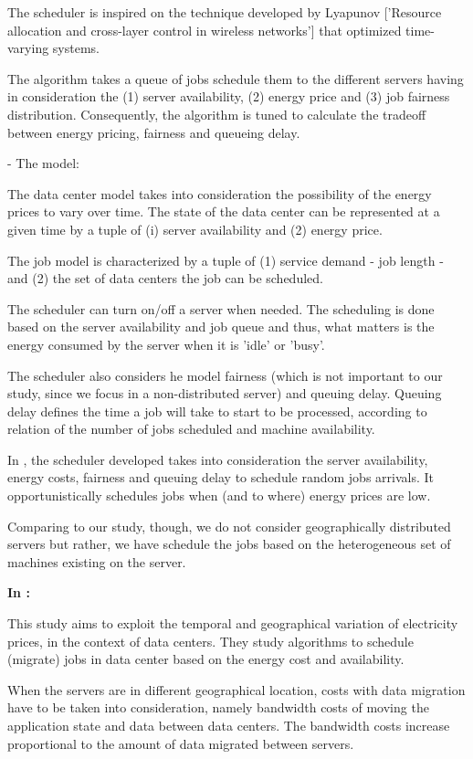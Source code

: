 The scheduler is inspired on the technique developed by Lyapunov ['Resource
allocation and cross-layer control in wireless networks'] that
optimized time-varying systems. 

The algorithm takes a queue of jobs schedule them to the different servers
having in consideration the (1) server availability, (2) energy price and (3)
job fairness distribution. Consequently, the algorithm is tuned to calculate the
tradeoff between energy pricing, fairness and queueing delay.

- The model:

The data center model takes into consideration the possibility of the energy
prices to vary over time. The state of the data center can be represented at a
given time by a tuple of (i) server availability and (2) energy price.

The job model is characterized by a tuple of (1) service demand - job length -
and (2) the set of data centers the job can be scheduled. 

The scheduler can turn on/off a server when needed. The scheduling is done based
on the server availability and job queue and thus, what matters is the energy
consumed by the server when it is 'idle' or 'busy'.

The scheduler also considers he model fairness (which is not important to
our study, since we focus in a non-distributed server) and queuing delay.
Queuing delay defines the time a job will take to start to be processed,
according to relation of the number of jobs scheduled and machine availability.

In \cite{EFF_JOB_SCHEDULING}, the scheduler developed takes into consideration
the server availability, energy costs, fairness and queuing delay to schedule
random jobs arrivals. It opportunistically schedules jobs when (and to where) 
energy prices are low.

Comparing to our study, though, we do not consider geographically distributed 
servers but rather, we have schedule the jobs based on the heterogeneous set of 
machines existing on the server.



\textbf{In \cite{MIGRATION_CLOUD}:}

This study aims to exploit the temporal and geographical variation of
electricity prices, in the context of data centers. They study algorithms to
schedule (migrate) jobs in data center based on the energy cost and
availability.

When the servers are in different geographical location, costs with data
migration have to be taken into consideration, namely bandwidth costs of moving
the application state and data between data centers. The bandwidth costs
increase proportional to the amount of data migrated between servers.

